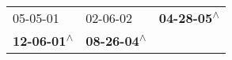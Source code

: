 \begin{supertabular}{lll}
                  05-05-01\textsuperscript{} &                   02-06-02\textsuperscript{} &  \textbf{04-28-05\textsuperscript{$\wedge$}} \\
 \textbf{12-06-01\textsuperscript{$\wedge$}} &  \textbf{08-26-04\textsuperscript{$\wedge$}} &                                              \\
\end{supertabular}
